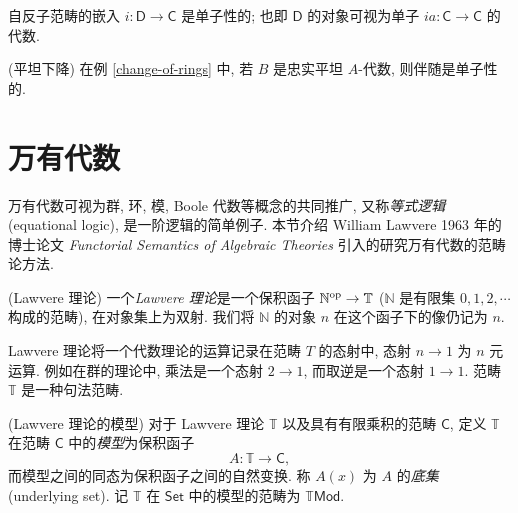 \begin{example}
	{}
	自反子范畴的嵌入 $i\colon \mathsf D\to\mathsf C$ 是单子性的; 也即 $\mathsf D$ 的对象可视为单子 $ia\colon \mathsf C\to\mathsf C$ 的代数.
\end{example}

\begin{example}
	{(平坦下降)}
	在例 \ref{change-of-rings} 中, 若 $B$ 是忠实平坦 $A$-代数, 则伴随是单子性的.
\end{example}





\section{万有代数}

\label{universal-algebra}

万有代数可视为群, 环, 模, Boole 代数等概念的共同推广, 又称\emph{等式逻辑} (equational logic), 是一阶逻辑的简单例子. 本节介绍 William Lawvere 1963 年的博士论文 \emph{Functorial Semantics of Algebraic Theories} 引入的研究万有代数的范畴论方法.

\begin{definition}
	[label={Lawvere-theory}]
	{(Lawvere 理论)}
	一个\emph{Lawvere 理论}是一个保积函子 $\mathbb{N}^{\text{op}}\to\mathbb T$ ($\mathbb{N}$ 是有限集 $0,1,2,\cdots$ 构成的范畴), 在对象集上为双射. 我们将 $\mathbb{N}$ 的对象 $n$ 在这个函子下的像仍记为 $n$.
\end{definition}

Lawvere 理论将一个代数理论的运算记录在范畴 $T$ 的态射中, 态射 $n \to 1$ 为 $n$ 元运算. 例如在群的理论中, 乘法是一个态射 $2 \to 1$, 而取逆是一个态射 $1\to 1$.
范畴 $\mathbb T$ 是一种句法范畴.

\begin{definition}
	{(Lawvere 理论的模型)}
	对于 Lawvere 理论 $\mathbb T$ 以及具有有限乘积的范畴 $\mathsf C$, 定义 $\mathbb T$ 在范畴 $\mathsf C$ 中的\emph{模型}为保积函子
	$$
	A \colon \mathbb T \to \mathsf {C},
	$$
	而模型之间的同态为保积函子之间的自然变换.
	称 $A(x)$ 为 $A$ 的\emph{底集} (underlying set).
	记 $\mathbb T$ 在 $\mathsf {Set}$ 中的模型的范畴为 $\mathbb T\mathsf {Mod}$.
\end{definition}

